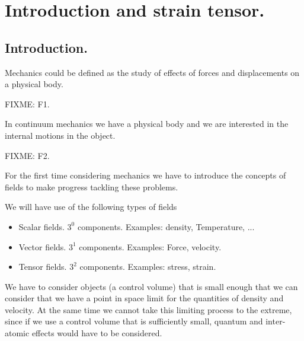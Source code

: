 %
%

\chapter{Introduction and strain tensor.}
\label{chap:continuumL2}
{}
\date{Jan 13, 2012}

\beginArtWithToc

\section{Introduction.}

Mechanics could be defined as the study of effects of forces and displacements on a physical body.

FIXME: F1.

In continuum mechanics we have a physical body and we are interested in the internal motions in the object.  

FIXME: F2.

For the first time considering mechanics we have to introduce the concepts of fields to make progress tackling these problems.

We will have use of the following types of fields

\begin{itemize}
\item Scalar fields.  $3^0$ components.  Examples: density, Temperature, ...
\item Vector fields.  $3^1$ components.  Examples: Force, velocity.
\item Tensor fields.  $3^2$ components.  Examples: stress, strain.
\end{itemize}

We have to consider objects (a control volume) that is small enough that we can consider that we have a point in space limit for the quantities of density and velocity.  At the same time we cannot take this limiting process to the extreme, since if we use a control volume that is sufficiently small, quantum and inter-atomic effects would have to be considered.

